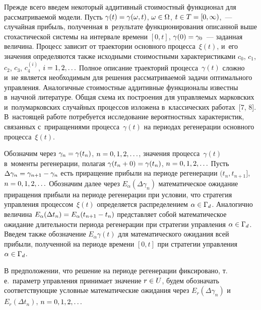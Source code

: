 \begin{multicols}{2}
  Прежде всего введем некоторый аддитивный стоимостный функционал для 
рас\-смат\-ри\-ва\-емой модели. Пусть $\gamma(t)\hm= \gamma(\omega, t)$, 
$\omega\hm\in \Omega$, $t\hm\in T\hm= [0,\infty)$,~--- случайная прибыль, 
полученная в~результате функционирования описанной выше стохастической 
сис\-те\-мы на интервале времени $[0,t]$, $\gamma(0)\hm= \gamma_0$~--- заданная 
величина. Процесс зависит от траектории основного процесса~$\xi(t)$, и~его 
значения определяются так\-же исходными стоимостными характеристиками 
$c_0$, $c_1$, $c_2$, $c_3$, $c_4^{(i)}$, $i\hm=1,2,\ldots$ Полное описание 
траекторий процесса~$\gamma(t)$ сложно и~не является необходимым для 
решения рас\-смат\-ри\-ва\-емой задачи оптимального управ\-ле\-ния. Аналогичные 
стоимостные аддитивные функционалы известны в~научной литературе. Общая 
схема их по\-стро\-ения для управ\-ля\-емых марковских и~полумарковских 
случайных процессов изложена в~классических работах~[7, 8]. В~настоящей 
работе потребуется исследование вероятностных характеристик, связанных 
с~приращениями процесса~$\gamma(t)$ на периодах регенерации основного 
процесса~$\xi(t)$.
  
  Обозначим через $\gamma_n\hm= \gamma(t_n)$, $n\hm=0,1,2,\ldots$,\linebreak
   значения 
процесса~$\gamma(t)$ в~моменты регенерации, полагая $\gamma(t_n+0)\hm= 
\gamma(t_n)$, $n\hm=0,1,2,\ldots$ Пусть $\Delta \gamma_n\hm= 
\gamma_{n+1}\hm-\gamma_n$ есть приращение прибыли на периоде 
регенерации $(t_n, t_{n+1}]$, $n\hm= 0,1,2,\ldots$ Обозначим далее через 
$E_\alpha(\Delta \gamma_n)$ математическое ожидание приращения прибыли 
на периоде регенерации при условии, что стратегия управ\-ле\-ния 
процессом~$\xi(t)$ определяется распределением $\alpha\hm\in \Gamma_d$. 
Аналогично величина $E_\alpha(\Delta t_n)\hm= E_\alpha(t_{n+1}\hm-t_n)$ 
представляет собой математическое ожидание дли\-тель\-ности периода 
регенерации при стратегии управ\-ле\-ния $\alpha\hm\in \Gamma_d$.  Введем 
также обозначение $E_\alpha \gamma(t)$ для математического ожидания всей 
прибыли, полученной на периоде времени $[0,t]$ при стратегии управ\-ле\-ния 
$\alpha\hm\in \Gamma_d$.
  
  В предположении, что решение на периоде регенерации фиксировано, т.\,е.\ 
параметр управ\-ле\-ния принимает значение $r\hm\in U$, будем обозначать 
соответствующие услов\-ные математические ожидания через $E_r(\Delta 
\gamma_n)$ и~$E_r(\Delta t_n)$, $n\hm=0,1,2,\ldots$
  

\end{multicols}
